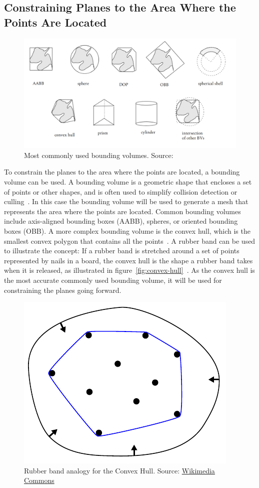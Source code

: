 \subsection{Constraining Planes to the Area Where the Points Are Located}\label{subsec:constraining-planes-to-the-area-where-the-points-are-located}

\begin{figure}[ht!]
    \centering
    \includegraphics[width=0.9\linewidth]{images/bounding-volumes}
    \caption{Most commonly used bounding volumes. Source: \cite{gabriel_zachmann_geometric_2002}}
\end{figure}

To constrain the planes to the area where the points are located, a bounding volume can be used.
A bounding volume is a geometric shape that encloses a set of points or other shapes,
and is often used to simplify collision detection or culling~\cite{gabriel_zachmann_geometric_2002}.
In this case the bounding volume will be used to generate a mesh that represents the area where the points are located.
Common bounding volumes include axis-aligned bounding boxes (AABB), spheres, or oriented bounding boxes (OBB).
A more complex bounding volume is the convex hull, which is the smallest convex polygon that contains all the points~\cite{gabriel_zachmann_geometric_2002}.
A rubber band can be used to illustrate the concept: If a rubber band is stretched around a set of points represented by nails in a board,
the convex hull is the shape a rubber band takes when it is released, as illustrated in figure~\ref{fig:convex-hull}~\cite{de_berg_computational_2008}.
As the convex hull is the most accurate commonly used bounding volume,
it will be used for constraining the planes going forward.

\begin{figure}[ht!]
    \centering
    \includegraphics[width=0.25\linewidth]{images/ConvexHull}
    \caption{Rubber band analogy for the Convex Hull. Source: \href{https://commons.wikimedia.org/wiki/File:ConvexHull.svg}{Wikimedia Commons}}
\end{figure}

